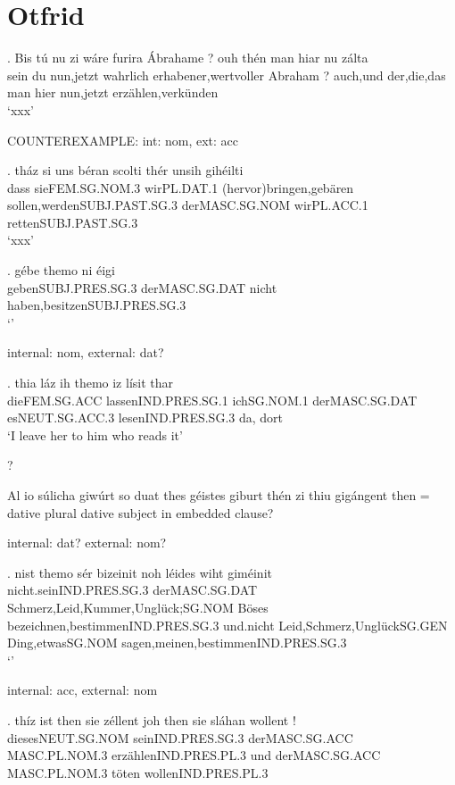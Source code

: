 \phantom{x}

\section{Otfrid}

\exg. Bis tú nu {zi wáre} furira Ábrahame ? ouh thén man hiar nu zálta\\
 sein du nun,jetzt wahrlich erhabener,wertvoller Abraham ? auch,und der,die,das man hier nun,jetzt erzählen,verkünden\\
 `xxx' \label{ex:ohg-dat-acc}

COUNTEREXAMPLE: int: nom, ext: acc

\exg. tház	si	uns	béran	scolti	thér	unsih	gihéilti\\
dass	sieFEM.SG.NOM.3	wirPL.DAT.1	(hervor)bringen,gebären	sollen,werdenSUBJ.PAST.SG.3	derMASC.SG.NOM	wirPL.ACC.1	rettenSUBJ.PAST.SG.3\\
 `xxx' 

 \exg. gébe themo	ni	éigi\\
 gebenSUBJ.PRES.SG.3	derMASC.SG.DAT	nicht	haben,besitzenSUBJ.PRES.SG.3\\
 `' 

  internal: nom, external: dat?

  \exg. thia	láz	ih	themo	iz	lísit	thar\\
  dieFEM.SG.ACC	lassenIND.PRES.SG.1	ichSG.NOM.1	derMASC.SG.DAT	esNEUT.SG.ACC.3	lesenIND.PRES.SG.3	da, dort\\
  `I leave her to him who reads it' 


?

Al	io	súlicha	giwúrt	so	duat	thes	géistes	giburt	thén	zi	thiu	gigángent
then = dative plural
dative subject in embedded clause?

internal: dat? external: nom?

\exg. nist	themo	sér	bizeinit	noh	léides	wiht	giméinit\\
nicht.seinIND.PRES.SG.3	derMASC.SG.DAT	Schmerz,Leid,Kummer,Unglück;SG.NOM Böses	bezeichnen,bestimmenIND.PRES.SG.3 und.nicht Leid,Schmerz,UnglückSG.GEN	Ding,etwasSG.NOM	sagen,meinen,bestimmenIND.PRES.SG.3\\
  `' 



internal: acc, external: nom

\exg. thíz	ist	then	sie	zéllent	joh	then	sie	sláhan	wollent	!\\
diesesNEUT.SG.NOM	seinIND.PRES.SG.3	derMASC.SG.ACC	MASC.PL.NOM.3	erzählenIND.PRES.PL.3		und	derMASC.SG.ACC	MASC.PL.NOM.3	töten	wollenIND.PRES.PL.3\\

